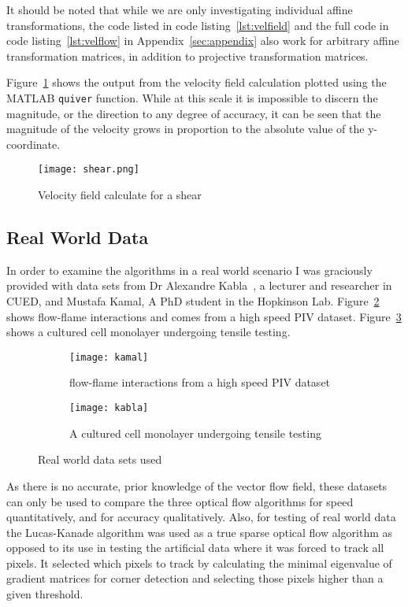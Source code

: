 It should be noted that while we are only investigating individual affine transformations, the code listed in code listing~\ref{lst:velfield} and the full code in code listing~\ref{lst:velflow} in Appendix~\ref{sec:appendix} also work for arbitrary affine transformation matrices, in addition to projective transformation matrices.

Figure~\ref{fig:shearfield} shows the output from the velocity field calculation plotted using the MATLAB \verb|quiver| function. While at this scale it is impossible to discern the magnitude, or the direction to any degree of accuracy, it can be seen that the magnitude of the velocity grows in proportion to the absolute value of the y-coordinate. 

\begin{figure}[h]
  \centering
  \texttt{[image: shear.png]}
  \caption{Velocity field calculate for a shear}
  \label{fig:shearfield}
\end{figure}

\subsection{Real World Data}

In order to examine the algorithms in a real world scenario I was graciously provided with data sets from Dr Alexandre Kabla~\cite{harris2012characterizing}, a lecturer and researcher in CUED, and Mustafa Kamal, A PhD student in the Hopkinson Lab. Figure~\ref{fig:kamal} shows flow-flame interactions and comes from a high speed PIV dataset. Figure~\ref{fig:kabla} shows a cultured cell monolayer undergoing tensile testing.

\begin{figure}[htbp!]
  \centering
  \begin{subfigure}[b]{0.49\textwidth}
    \texttt{[image: kamal]}
    \caption{flow-flame interactions from a high speed PIV dataset}
    \label{fig:kamal}
  \end{subfigure}
  \begin{subfigure}[b]{0.49\textwidth}
    \texttt{[image: kabla]}
    \caption{A cultured cell monolayer undergoing tensile testing}
    \label{fig:kabla}
  \end{subfigure}
  \caption{Real world data sets used}
  \label{fig:realworld}
\end{figure}

As there is no accurate, prior knowledge of the vector flow field, these datasets can only be used to compare the three optical flow algorithms for speed quantitatively, and for accuracy qualitatively. Also, for testing of real world data the Lucas-Kanade algorithm was used as a true sparse optical flow algorithm as opposed to its use in testing the artificial data where it was forced to track all pixels. It selected which pixels to track by calculating the minimal eigenvalue of gradient matrices for corner detection and selecting those pixels higher than a given threshold.
